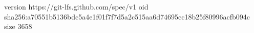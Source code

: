 version https://git-lfs.github.com/spec/v1
oid sha256:a70551b5136bdc5a4e1f01f7f7d5a2c515aa6d74695cc18b25f80996acfb094c
size 3658
